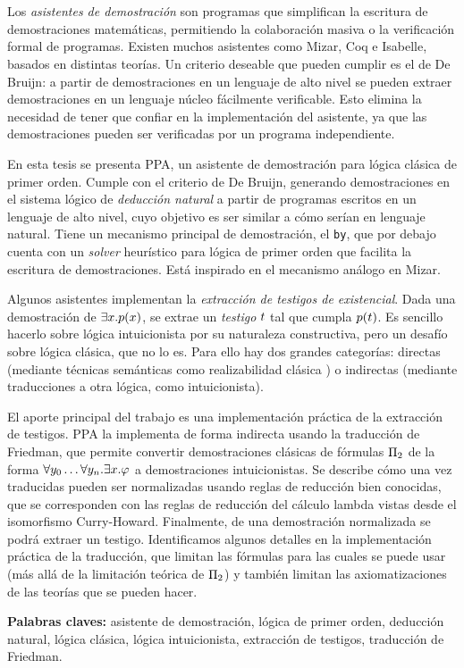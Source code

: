 \chapter*{\runtitulo}

\noindent Los \textit{asistentes de demostración} son programas que simplifican
la escritura de demostraciones matemáticas, permitiendo la colaboración masiva o
la verificación formal de programas. Existen muchos asistentes como Mizar, Coq e
Isabelle, basados en distintas teorías. Un criterio deseable que pueden cumplir
es el de De Bruijn: a partir de demostraciones en un lenguaje de alto nivel se pueden extraer demostraciones en un lenguaje núcleo fácilmente verificable. Esto elimina la necesidad de tener que confiar en la implementación del asistente, ya que las demostraciones pueden ser verificadas por un programa independiente.

En esta tesis se presenta PPA, un asistente de demostración para lógica clásica
de primer orden. Cumple con el criterio de De Bruijn, generando demostraciones
en el sistema lógico de \textit{deducción natural} a partir de programas
escritos en un lenguaje de alto nivel, cuyo objetivo es ser similar a cómo
serían en lenguaje natural. Tiene un mecanismo principal de demostración, el \texttt{by},
que por debajo cuenta con un \textit{solver} heurístico para lógica de primer
orden que facilita la escritura de demostraciones. Está inspirado en el
mecanismo análogo en Mizar.

Algunos asistentes implementan la \textit{extracción de testigos de
existencial}. Dada una demostración de $\exists x . p(x)$, se extrae
un \textit{testigo} $t$ tal que cumpla $p(t)$. Es sencillo hacerlo sobre lógica intuicionista por su naturaleza constructiva, pero un desafío sobre lógica clásica, que no lo es. Para ello hay dos grandes categorías: directas (mediante técnicas semánticas como realizabilidad clásica \cite{miquel-friedman}) o indirectas (mediante traducciones a otra lógica, como intuicionista).

El aporte principal del trabajo es una implementación práctica de la extracción
de testigos. PPA la implementa de forma indirecta usando la traducción de
Friedman, que permite convertir  demostraciones clásicas de fórmulas
$\Pi_{2}$ de la forma $\forall y_0 \dots \forall y_n . \exists
x . \varphi$ a demostraciones intuicionistas. Se describe cómo una vez traducidas pueden
ser normalizadas usando reglas de reducción bien conocidas, que se corresponden con las reglas de reducción del cálculo lambda vistas desde el isomorfismo
Curry-Howard. Finalmente, de una demostración normalizada se podrá extraer un
testigo. Identificamos algunos detalles en la implementación práctica de la
traducción, que limitan las fórmulas para las cuales se puede usar (más allá de
la limitación teórica de $\Pi_{2}$) y también limitan las axiomatizaciones
de las teorías que se pueden hacer.

\bigskip

\noindent\textbf{Palabras claves:} asistente de demostración, lógica de primer orden, deducción natural, lógica clásica, lógica intuicionista, extracción de testigos, traducción de Friedman.